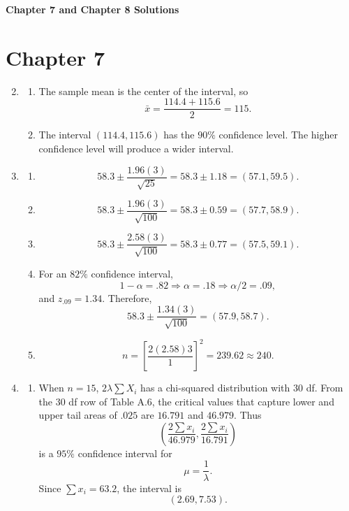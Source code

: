 \documentclass[12pt]{article}
\begin{document}
\begin{center}
    {\Large \textbf{Chapter 7 and Chapter 8 Solutions}}
\end{center}

\section*{Chapter 7}

\begin{enumerate}[label=\textbf{\arabic*.}, leftmargin=*]

\setcounter{enumi}{1}
\item
\begin{enumerate}[label=\alph*.]
    \item The sample mean is the center of the interval, so
    \[
    \bar{x}=\frac{114.4+115.6}{2}=115.
    \]
    \item The interval $(114.4,115.6)$ has the $90\%$ confidence level. The higher confidence level will produce a wider interval.
\end{enumerate}

\setcounter{enumi}{3}
\item
\begin{enumerate}[label=\alph*.]
    \item
    \[
    58.3\pm \frac{1.96(3)}{\sqrt{25}}=58.3\pm1.18=(57.1,59.5).
    \]
    \item
    \[
    58.3\pm \frac{1.96(3)}{\sqrt{100}}=58.3\pm0.59=(57.7,58.9).
    \]
    \item
    \[
    58.3\pm \frac{2.58(3)}{\sqrt{100}}=58.3\pm0.77=(57.5,59.1).
    \]
    \item For an $82\%$ confidence interval,
    \[
    1-\alpha=.82\Rightarrow \alpha=.18\Rightarrow \alpha/2=.09,
    \]
    and $z_{.09}=1.34$. Therefore,
    \[
    58.3\pm \frac{1.34(3)}{\sqrt{100}}=(57.9,58.7).
    \]
    \item
    \[
    n=\left[\frac{2(2.58)3}{1}\right]^2=239.62\approx240.
    \]
\end{enumerate}

\setcounter{enumi}{9}
\item
\begin{enumerate}[label=\alph*.]
    \item When $n=15$, $2\lambda\sum X_i$ has a chi-squared distribution with $30$ df. From the $30$ df row of Table A.6, the critical values that capture lower and upper tail areas of $.025$ are $16.791$ and $46.979$. Thus
    \[
    \left(\frac{2\sum x_i}{46.979},\frac{2\sum x_i}{16.791}\right)
    \]
    is a $95\%$ confidence interval for
    \[
    \mu=\frac{1}{\lambda}.
    \]
    Since $\sum x_i=63.2$, the interval is
    \[
    (2.69,7.53).
    \]


\end{enumerate}
\end{enumerate}
\end{document}
